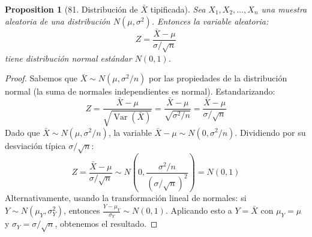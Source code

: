 \documentclass[11pt,a4paper]{article}
\theoremstyle{plain}
\newtheorem{proposition}[theorem]{Proposition}
\theoremstyle{definition}
\begin{document}
\begin{proposition}[81. Distribución de $\bar{X}$ tipificada]
Sea $X_1, X_2, \ldots, X_n$ una muestra aleatoria de una distribución $N(\mu, \sigma^2)$. Entonces la variable aleatoria:
\[
Z = \frac{\bar{X} - \mu}{\sigma/\sqrt{n}}
\]
tiene distribución normal estándar $N(0, 1)$.
\end{proposition}

\begin{proof}
Sabemos que $\bar{X} \sim N(\mu, \sigma^2/n)$ por las propiedades de la distribución normal (la suma de normales independientes es normal). Estandarizando:
\[
Z = \frac{\bar{X} - \mu}{\sqrt{\operatorname{Var}(\bar{X})}} = \frac{\bar{X} - \mu}{\sqrt{\sigma^2/n}} = \frac{\bar{X} - \mu}{\sigma/\sqrt{n}}
\]
Dado que $\bar{X} \sim N(\mu, \sigma^2/n)$, la variable $\bar{X} - \mu \sim N(0, \sigma^2/n)$. Dividiendo por su desviación típica $\sigma/\sqrt{n}$:
\[
Z = \frac{\bar{X} - \mu}{\sigma/\sqrt{n}} \sim N\left(0, \frac{\sigma^2/n}{(\sigma/\sqrt{n})^2}\right) = N(0, 1)
\]
Alternativamente, usando la transformación lineal de normales: si $Y \sim N(\mu_Y, \sigma_Y^2)$, entonces $\frac{Y - \mu_Y}{\sigma_Y} \sim N(0,1)$. Aplicando esto a $Y = \bar{X}$ con $\mu_Y = \mu$ y $\sigma_Y = \sigma/\sqrt{n}$, obtenemos el resultado.
\end{proof}
\end{document}
